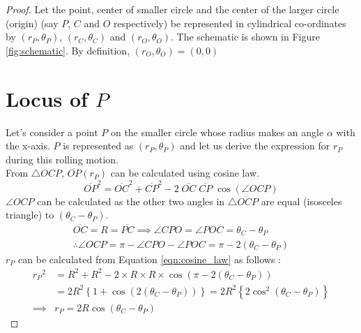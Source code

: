 \documentclass[12pt]{article}
\begin{document}
\begin{proof}
    Let the point, center of smaller circle and the center of the larger circle (origin) (say $P$, $C$ and $O$ respectively) be represented in cylindrical co-ordinates by $(r_P, \theta_P)$, $(r_C, \theta_C)$ and $(r_O, \theta_O)$. The schematic is shown in Figure \ref{fig:schematic}. By definition, $(r_O, \theta_O) = (0, 0)$
    \section{Locus of $P$}
    Let's consider a point $P$ on the smaller circle whose radius makes an angle $\alpha$ with the x-axis. $P$ is represented as $(r_P, \theta_P)$ and let us derive the expression for $r_P$ during this rolling motion.\\
    From $\triangle OCP$, $\overline{OP}(r_P)$ can be calculated using cosine law.
    \begin{equation}
        {\overline{OP}}^2 = {\overline{OC}}^2 + {\overline{CP}}^2 - 2 \; \overline{OC} \; \overline{CP} \; \cos(\angle OCP) \label{eqn:cosine_law}
    \end{equation}
    $\angle OCP$ can be calculated as the other two angles in $\triangle OCP$ are equal (isosceles triangle) to $\left( \theta_C-\theta_P \right)$.
    \begin{gather*}
        \overline{OC} = R = \overline{PC} \implies \angle CPO = \angle POC = \theta_C-\theta_P \\
        \therefore \angle OCP = \pi - \angle CPO - \angle POC = \pi - 2 \left(\theta_C-\theta_P\right)
    \end{gather*}
    $r_P$ can be calculated from Equation \ref{eqn:cosine_law} as follows :
    \begin{align}
        {r_P}^2 &= R^2 + R^2 - 2 \times R \times R \times \cos(\pi - 2 \left(\theta_C-\theta_P\right)) \nonumber \\
                &= 2 R^2 \left\{ 1 + \cos\left(2 \left(\theta_C-\theta_P\right)\right) \right\} = 2 R^2 \left\{ 2 \cos^2\left(\theta_C-\theta_P\right) \right\} \nonumber \\
        \implies &\boxed{r_P = 2R\cos\left(\theta_C-\theta_P\right)} \label{eqn:locus_r}
    \end{align}

\end{proof}
\end{document}
